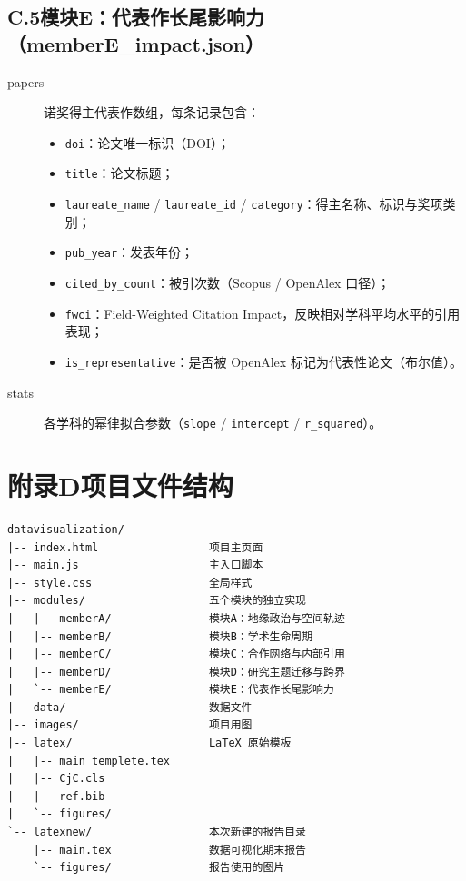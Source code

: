 \documentclass[UTF8]{CjC}
\theoremstyle{mystyle}
\begin{document}
{\subsection*{C.5\quad 模块E：代表作长尾影响力（memberE\_impact.json）}
\begin{description}
    \item[papers] 诺奖得主代表作数组，每条记录包含：
    \begin{itemize}
        \item \texttt{doi}：论文唯一标识（DOI）；
        \item \texttt{title}：论文标题；
        \item \texttt{laureate\_name} / \texttt{laureate\_id} / \texttt{category}：得主名称、标识与奖项类别；
        \item \texttt{pub\_year}：发表年份；
        \item \texttt{cited\_by\_count}：被引次数（Scopus / OpenAlex 口径）；
        \item \texttt{fwci}：Field-Weighted Citation Impact，反映相对学科平均水平的引用表现；
        \item \texttt{is\_representative}：是否被 OpenAlex 标记为代表性论文（布尔值）。
    \end{itemize}
    \item[stats] 各学科的幂律拟合参数（\texttt{slope} / \texttt{intercept} / \texttt{r\_squared}）。
\end{description}

\vspace{5mm}


\section*{附录D\quad 项目文件结构}

\begin{verbatim}
datavisualization/
|-- index.html                 项目主页面
|-- main.js                    主入口脚本
|-- style.css                  全局样式
|-- modules/                   五个模块的独立实现
|   |-- memberA/               模块A：地缘政治与空间轨迹
|   |-- memberB/               模块B：学术生命周期
|   |-- memberC/               模块C：合作网络与内部引用
|   |-- memberD/               模块D：研究主题迁移与跨界
|   `-- memberE/               模块E：代表作长尾影响力
|-- data/                      数据文件
|-- images/                    项目用图
|-- latex/                     LaTeX 原始模板
|   |-- main_templete.tex
|   |-- CjC.cls
|   |-- ref.bib
|   `-- figures/
`-- latexnew/                  本次新建的报告目录
    |-- main.tex               数据可视化期末报告
    `-- figures/               报告使用的图片
\end{verbatim}

}
\end{document}
